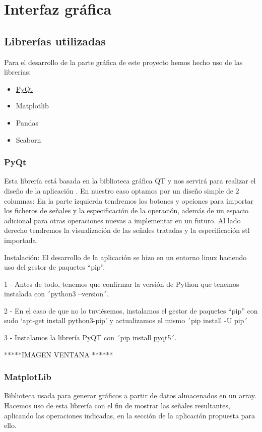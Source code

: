 \chapter{Interfaz gráfica}
\label{cha:gui}
 
\section{Librerías utilizadas}

Para el desarrollo de la parte gráfica de este proyecto hemos hecho uso de las librerías:
\begin{itemize}
\item \href{https://www.qt.io/qt-for-python}{PyQt}
\item Matplotlib
\item Pandas
\item Seaborn
\end{itemize}
 
\subsection{PyQt}
Esta librería está basada en la biblioteca gráfica QT y nos servirá para realizar el diseño de la aplicación    . En nuestro caso optamos por un diseño simple de 2 columnas: En la parte izquierda tendremos los botones y opciones para importar los ficheros de señales y la especificación de la operación, además de un espacio adicional para otras operaciones nuevas a implementar en un futuro. Al lado derecho tendremos la visualización de las señales tratadas y la especificación stl importada.
 
Instalación: 
El desarrollo de la aplicación se hizo en un entorno linux haciendo uso del gestor de paquetes “pip”. 
 
1 - Antes de todo, tenemos que confirmar la versión de Python que tenemos instalada con ´python3 --version´.
 
2 - En el caso de que no lo tuviésemos, instalamos el gestor de paquetes “pip” con sudo ‘apt-get install python3-pip’ y actualizamos el mismo ´pip install -U pip´ 
 
3 - Instalamos la librería PyQT con ´pip install pyqt5´. 
 
*****IMAGEN VENTANA ****** 
 
\subsection{MatplotLib}
Biblioteca usada para generar gráficos a partir de datos almacenados en un array. Hacemos uso de esta librería con el fin de mostrar las señales resultantes, aplicando las operaciones indicadas, en la sección de la aplicación propuesta para ello. 
 
